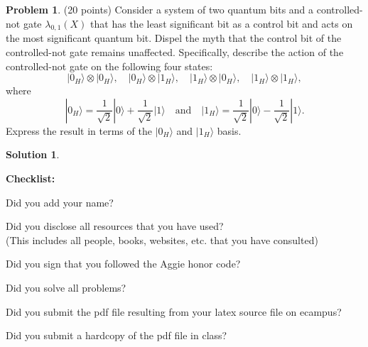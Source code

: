 \documentclass{article}
\theoremstyle{definition}
\newtheorem{problem}{Problem}
\newtheorem*{solution}{Solution}
\newcommand{\ket}[1]{|#1\rangle}
\newcommand{\checklist}{\noindent\textbf{Checklist:}
\begin{compactitem}[$\Box$] 
\item Did you add your name? 
\item Did you disclose all resources that you have used? \\
(This includes all people, books, websites, etc. that you have consulted)
\item Did you sign that you followed the Aggie honor code? 
\item Did you solve all problems? 
\item Did you submit the pdf file resulting from your latex source
  file on ecampus? 
\item Did you submit a hardcopy of the pdf file in class? 
\end{compactitem}
}
\begin{document}
\begin{problem}(20 points) 
  Consider a system of two quantum bits and a controlled-not gate
  $\lambda_{0,1}(X)$ that has the least significant bit as a control
  bit and acts on the most significant quantum bit. Dispel the myth
  that the control bit of the controlled-not gate remains
  unaffected. Specifically, describe the action of the controlled-not gate on the
  following four states:
$$ 
\ket{0_H} \otimes \ket{0_H}, \quad 
\ket{0_H} \otimes \ket{1_H}, \quad 
\ket{1_H} \otimes \ket{0_H}, \quad 
\ket{1_H} \otimes \ket{1_H},
$$
where 
$$ \ket{0_H} = \frac{1}{\sqrt{2}}\ket{0} +
\frac{1}{\sqrt{2}}\ket{1}\quad\text{and}\quad
\ket{1_H} = \frac{1}{\sqrt{2}}\ket{0} -
\frac{1}{\sqrt{2}}\ket{1}.$$
Express the result in terms of the $\ket{0_H}$ and $\ket{1_H}$ basis. 
\end{problem}
\begin{solution}
\end{solution}


















\goodbreak
\checklist
\end{document}
